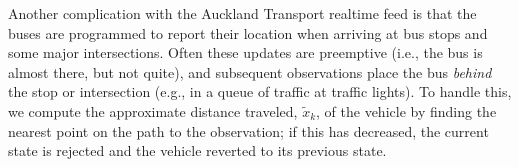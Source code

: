 Another complication with the Auckland Transport realtime feed is that
the buses are programmed to report their location when arriving at
bus stops and some major intersections.
Often these updates are preemptive 
(i.e., the bus is almost there, but not quite),
and subsequent observations place the bus \emph{behind} the stop or intersection
(e.g., in a queue of traffic at traffic lights).
To handle this, we compute the approximate distance traveled, $\tilde x_k$,
of the vehicle by finding the nearest point on the path to the observation;
if this has decreased, the current state is rejected and the vehicle reverted
to its previous state.


